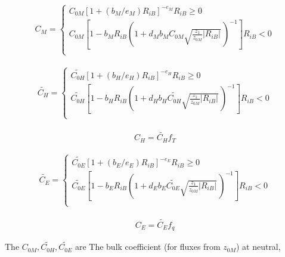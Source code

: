 \begin{eqnarray}
C_M = \left\{ 
      \begin{array}{lr}
      C_{0M} [ 1 + (b_M/e_M) R_{iB} ]^{-e_M} 
          R_{iB} \geq 0 \\
      C_{0M} \left[ 1 - b_M R_{iB} \left( 1+ d_M b_M C_{0M}
                                  \sqrt{\frac{z_1}{z_{0M}}| R_{iB}|} \,
                                  \right)^{-1} \right]      
          R_{iB} < 0 \\
      \end{array} \right.
\end{eqnarray}

\begin{eqnarray}
\widetilde{C_H} = \left\{ 
      \begin{array}{lr}
      \widetilde{C_{0H}} [ 1 + (b_H/e_H) R_{iB} ]^{-e_H} 
          R_{iB} \geq 0 \\
      \widetilde{C_{0H}} \left[ 1 - b_H R_{iB} 
                                  \left( 1+ d_H b_H \widetilde{C_{0H}}
                                  \sqrt{\frac{z_1}{z_{0M}}| R_{iB}|} \,
                                  \right)^{-1} \right]      
          R_{iB} < 0 \\
      \end{array} \right.
\end{eqnarray}

\begin{eqnarray}
C_H = \widetilde{C_H} f_T 
\end{eqnarray}

\begin{eqnarray}
\widetilde{C_E} = \left\{ 
      \begin{array}{lr}
      \widetilde{C_{0E}} [ 1 + (b_E/e_E) R_{iB} ]^{-e_E} 
          R_{iB} \geq 0 \\
      \widetilde{C_{0E}} \left[ 1 - b_E R_{iB} 
                                  \left( 1+ d_E b_E \widetilde{C_{0E}}
                                  \sqrt{\frac{z_1}{z_{0M}}| R_{iB}|} \,
                                  \right)^{-1} \right]      
          R_{iB} < 0 \\
      \end{array} \right.
\end{eqnarray}

\begin{eqnarray}
C_E = \widetilde{C_E} f_q 
\end{eqnarray}

The \(C_{0M}, \widetilde{C_{0H}}, \widetilde{C_{0E}}\) are The bulk
coefficient (for fluxes from \(z_{0M}\)) at neutral,

